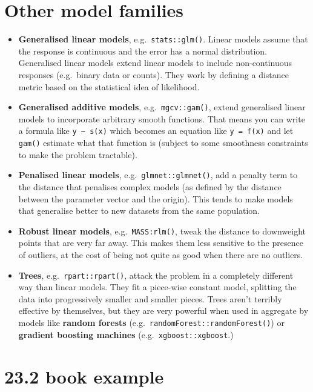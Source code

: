 \documentclass[]{book}
\theoremstyle{definition}
\theoremstyle{definition}
\theoremstyle{definition}
\theoremstyle{remark}
\begin{document}
\hypertarget{other-model-families}{%
\section{Other model families}\label{other-model-families}}

\begin{itemize}
\item
  \textbf{Generalised linear models}, e.g.~\texttt{stats::glm()}. Linear
  models assume that the response is continuous and the error has a
  normal distribution. Generalised linear models extend linear models to
  include non-continuous responses (e.g.~binary data or counts). They
  work by defining a distance metric based on the statistical idea of
  likelihood.
\item
  \textbf{Generalised additive models}, e.g.~\texttt{mgcv::gam()},
  extend generalised linear models to incorporate arbitrary smooth
  functions. That means you can write a formula like
  \texttt{y\ \textasciitilde{}\ s(x)} which becomes an equation like
  \texttt{y\ =\ f(x)} and let \texttt{gam()} estimate what that function
  is (subject to some smoothness constraints to make the problem
  tractable).
\item
  \textbf{Penalised linear models}, e.g.~\texttt{glmnet::glmnet()}, add
  a penalty term to the distance that penalises complex models (as
  defined by the distance between the parameter vector and the origin).
  This tends to make models that generalise better to new datasets from
  the same population.
\item
  \textbf{Robust linear models}, e.g.~\texttt{MASS:rlm()}, tweak the
  distance to downweight points that are very far away. This makes them
  less sensitive to the presence of outliers, at the cost of being not
  quite as good when there are no outliers.
\item
  \textbf{Trees}, e.g.~\texttt{rpart::rpart()}, attack the problem in a
  completely different way than linear models. They fit a piece-wise
  constant model, splitting the data into progressively smaller and
  smaller pieces. Trees aren't terribly effective by themselves, but
  they are very powerful when used in aggregate by models like
  \textbf{random forests} (e.g.~\texttt{randomForest::randomForest()})
  or \textbf{gradient boosting machines}
  (e.g.~\texttt{xgboost::xgboost}.)
\end{itemize}

\hypertarget{book-example}{%
\section{23.2 book example}\label{book-example}}
\end{document}
